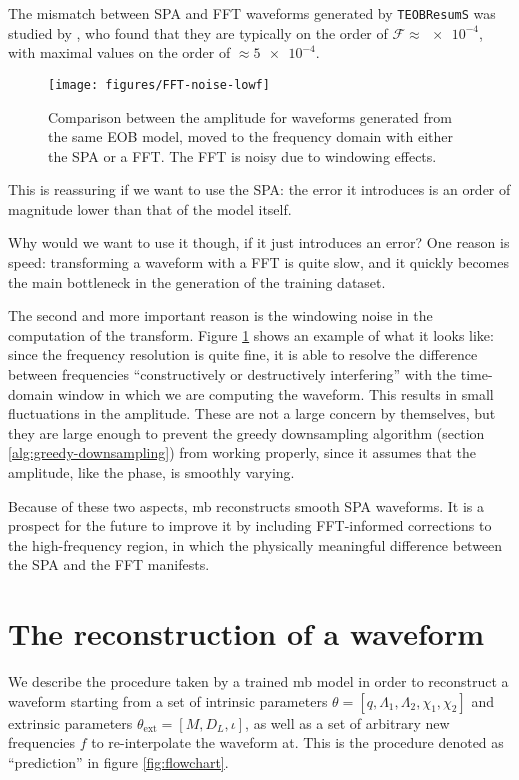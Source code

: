 \documentclass[main.tex]{subfiles}
\begin{document}
The mismatch between \ac{SPA} and \ac{FFT} waveforms generated by \texttt{TEOBResumS} was studied by \textcite{gambaFastFaithfulFrequencydomain2020}, who found that they are typically on the order of \(\mathcal{F} \approx \num{e-4}\), with maximal values on the order of \(\approx \num{5e-4}\).

\begin{figure}[ht]
\centering
\texttt{[image: figures/FFT-noise-lowf]}
\caption{Comparison between the amplitude for waveforms generated from the same \ac{EOB} model, moved to the frequency domain with either the \ac{SPA} or a \ac{FFT}. The \ac{FFT} is noisy due to windowing effects.}
\label{fig:FFT-noise-lowf}
\end{figure}

This is reassuring if we want to use the \ac{SPA}: the error it introduces is an order of magnitude lower than that of the model itself. 

Why would we want to use it though, if it just introduces an error?
One reason is speed: transforming a waveform with a \ac{FFT} is quite slow, and it quickly becomes the main bottleneck in the generation of the training dataset.

The second and more important reason is the windowing noise in the computation of the transform.
Figure \ref{fig:FFT-noise-lowf} shows an example of what it looks like: since the frequency resolution is quite fine, it is able to resolve the difference between frequencies ``constructively or destructively interfering'' with the time-domain window in which we are computing the waveform. 
This results in small fluctuations in the amplitude. These are not a large concern by themselves, but they are large enough to prevent the greedy downsampling algorithm (section \ref{alg:greedy-downsampling}) from working properly, since it assumes that the amplitude, like the phase, is smoothly varying. 

Because of these two aspects, \ac{mb} reconstructs smooth \ac{SPA} waveforms. It is a prospect for the future to improve it by including \ac{FFT}-informed corrections to the high-frequency region, in which the physically meaningful difference between the \ac{SPA} and the \ac{FFT} manifests. 

\section{The reconstruction of a waveform}

We describe the procedure taken by a trained \ac{mb} model in order to reconstruct a waveform starting from a set of intrinsic parameters \(\theta = [q, \Lambda_1 , \Lambda_2 , \chi_1 , \chi_2 ]\) and extrinsic parameters \(\theta _{\text{ext}} = [M, D_L, \iota]\), as well as a set of arbitrary new frequencies \(f\) to re-interpolate the waveform at. 
This is the procedure denoted as ``prediction'' in figure \ref{fig:flowchart}.
\end{document}
